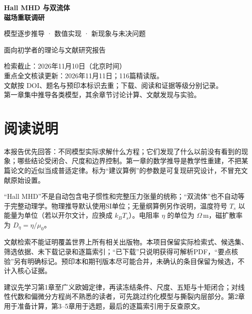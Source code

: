 \documentclass[UTF8,a4paper,11pt,openany,fontset=fandol]{ctexbook}
\begin{document}
\frontmatter
\begin{titlepage}
\vspace*{20mm}
{\sffamily\Huge\bfseries\color{ink}Hall MHD 与双流体\\[8pt]磁场重联调研\par}
\vspace{12mm}
{\sffamily\Large 模型逐步推导 · 数值实现 · 新现象与未决问题\par}
\vspace{14mm}
{\large 面向初学者的理论与文献研究报告\par}
\vfill
检索截止：2026年11月10日（北京时间）\\[5pt]
重点全文核读更新：2026年11月11日；116篇精读版。\\[5pt]
文献按 DOI、题名与预印本标识去重；下载、阅读和证据等级分别记录。\\[5pt]
第一章集中推导各类模型，其余章节讨论计算、文献发现与实验。\\[8pt]

\end{titlepage}
\chapter*{阅读说明}
本报告优先回答：不同模型实际求解什么方程；它们发现了什么以前没有看到的现象；哪些结论受闭合、尺度和边界控制。第一章的数学推导是教学性重建，不把某篇论文的近似当成普适定律。标为“建议算例”的参数是可复现研究设计，不冒充文献原始设置。

“Hall MHD”不是自动包含电子惯性和完整压力张量的统称；“双流体”也不自动等于完整动理学。物理推导默认使用SI单位；无量纲算例另作说明，温度符号 $T_s$ 以能量为单位（若以开尔文计，应换成 $k_BT_s$）。电阻率 $\eta$ 的单位为 $\Omega\,\mathrm m$，磁扩散率为 $D_\eta=\eta/\mu_0$。

文献检索不能证明覆盖世界上所有相关出版物。本项目保留实际检索式、候选集、筛选依据、未下载记录和逐篇索引；“已下载”只说明获得可解析PDF，“要点核验”另有明确标记。预印本和期刊版本尽可能合并，未确认的条目保留为候选，不计入核心证据。

建议先学习第1章至广义欧姆定律，再读冻结条件、尺度、五矩与十矩闭合；对线性代数和偏微分方程尚不熟悉的读者，可先跳过约化模型与撕裂内层部分。第2章用于准备计算，第3--5章用于选题，最后的逐篇索引用于反查原文。
\tableofcontents
\mainmatter











\backmatter


\end{document}
